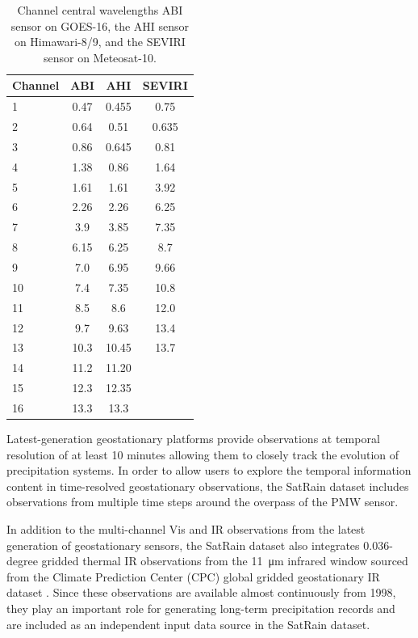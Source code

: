 \documentclass[11pt]{article}
\begin{document}
\begin{table}[htbp]
  \centering
    \begin{tabular}{lccc}
      \toprule
      Channel & ABI & AHI & SEVIRI \\
      \midrule
      1 & 0.47 & 0.455 & 0.75  \\
      2 & 0.64 & 0.51  & 0.635 \\
      3 & 0.86 & 0.645 & 0.81  \\
      4 & 1.38 & 0.86  & 1.64  \\
      5 & 1.61 & 1.61  & 3.92  \\
      6 & 2.26 & 2.26  & 6.25  \\
      7 & 3.9  & 3.85  & 7.35  \\
      8 & 6.15 & 6.25  & 8.7   \\
      9 & 7.0  & 6.95  & 9.66  \\
      10 & 7.4  & 7.35  & 10.8 \\
      11 & 8.5  & 8.6   & 12.0 \\
      12 & 9.7  & 9.63  & 13.4 \\
      13 & 10.3 & 10.45 & 13.7 \\
      14 & 11.2 & 11.20 &    \\
      15 & 12.3 & 12.35 &    \\
      16 & 13.3 & 13.3  &    \\
      \bottomrule
	\end{tabular}
	\caption{Channel central wavelengths ABI sensor on GOES-16, the AHI sensor on Himawari-8/9, and the SEVIRI sensor on Meteosat-10.}
  \label{tab:geo_channels}
\end{table}

Latest-generation geostationary platforms provide observations at temporal
resolution of at least 10 minutes allowing them to closely track the evolution of
precipitation systems. In order to allow users to explore the temporal
information content in time-resolved geostationary observations, the SatRain
dataset includes observations from multiple time steps around the overpass of
the PMW sensor.

In addition to the multi-channel Vis and IR observations from the latest
generation of geostationary sensors, the SatRain dataset also integrates
0.036-degree gridded thermal IR observations from the \SI{11}{\micro \meter}
infrared window sourced from the Climate Prediction Center (CPC) global gridded
geostationary IR dataset \citep{NCEP_CPC_L3_IR}. Since these observations are
available almost continuously from 1998, they play an important role for
generating long-term precipitation records and are included as an independent
input data source in the SatRain dataset.
\end{document}
